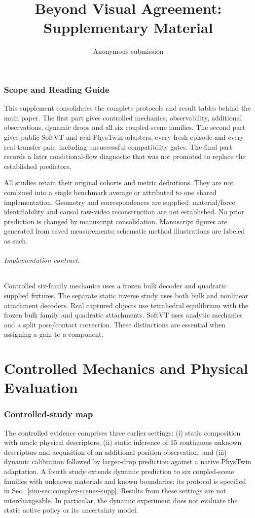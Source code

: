 \documentclass[10pt,twocolumn,letterpaper]{article}
\title{Beyond Visual Agreement:\\Supplementary Material}
\author{Anonymous submission}
\begin{document}
\maketitle
\section{Scope and Reading Guide}
This supplement consolidates the complete protocols and result tables behind the main paper. The first part gives controlled mechanics, observability, additional observations, dynamic drops and all six coupled-scene families. The second part gives public SoftVT and real PhysTwin adapters, every fresh episode and every real transfer pair, including unsuccessful compatibility gates. The final part records a later conditional-flow diagnostic that was not promoted to replace the established predictors.

All studies retain their original cohorts and metric definitions. They are not combined into a single benchmark average or attributed to one shared implementation. Geometry and correspondences are supplied; material/force identifiability and causal raw-video reconstruction are not established. No prior prediction is changed by manuscript consolidation. Manuscript figures are generated from saved measurements; schematic method illustrations are labeled as such.

\paragraph{Implementation contract.}
Controlled six-family mechanics uses a frozen bulk decoder and quadratic supplied fixtures. The separate static inverse study uses both bulk and nonlinear attachment decoders. Real captured objects use tetrahedral equilibrium with the frozen bulk family and quadratic attachments. SoftVT uses analytic mechanics and a split pose/contact correction. These distinctions are essential when assigning a gain to a component.



\part*{Controlled Mechanics and Physical Evaluation}

\section{Controlled-study map}
The controlled evidence comprises three earlier settings: (i) static composition with oracle physical descriptors, (ii) static inference of 15 continuous unknown descriptors and acquisition of an additional position observation, and (iii) dynamic calibration followed by larger-drop prediction against a native PhysTwin adaptation. A fourth study extends dynamic prediction to six coupled-scene families with unknown materials and known boundaries; its protocol is specified in Sec.~\ref{sim-sec:complex-scenes-supp}. Results from these settings are not interchangeable. In particular, the dynamic experiment does not evaluate the static active policy or its uncertainty model.
\end{document}
